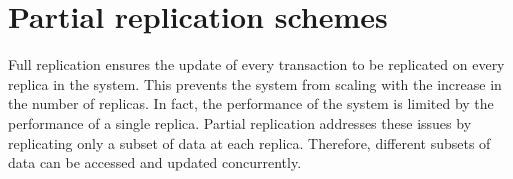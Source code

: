 
\section{Partial replication schemes}

Full replication ensures the update of every transaction to be replicated on
every replica in the system. This prevents the system from scaling with the
increase in the number of replicas. In fact, the performance of the system is
limited by the performance of a single replica. Partial replication addresses
these issues by replicating only a subset of data at each replica. Therefore,
different subsets of data can be accessed and updated concurrently. 


